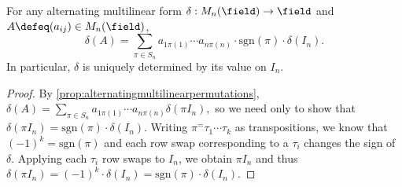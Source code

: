 \begin{corollary}\label{cor:detuniqueness}
    For any alternating multilinear form $\delta : M_n(\field) \to \field$ and $A \defeq (a_{ij}) \in M_{n}(\field)$, \[
    \delta(A)= \sum_{\pi \in S_n} a_{1 \pi(1)} \cdots a_{n \pi(n)} \cdot \text{sgn}(\pi) \cdot \delta(I_n).
    \]
    In particular, $\delta$ is uniquely determined by its value on $I_n$.
\end{corollary}
\begin{proof}
    By \cref{prop:alternatingmultilinearpermutations}, $\delta(A) = \sum_{\pi \in S_n} a_{1 \pi(1)} \cdots a_{n \pi(n)}  \delta(\pi I_n),$ so we need only to show that $\delta(\pi I_n) = \text{sgn}(\pi) \cdot \delta(I_n)$. Writing $\pi^ = \tau_1 \cdots \tau_k$ as transpositions, we know that $(-1)^k = \text{sgn}(\pi)$ and each row swap corresponding to a $\tau_i$ changes the sign of $\delta$. Applying each $\tau_i$ row swaps to $I_n$, we obtain $\pi I_n$ and thus $\delta(\pi I_n) = (-1)^k \cdot \delta(I_n) = \text{sgn}(\pi) \cdot \delta(I_n)$.
\end{proof}


